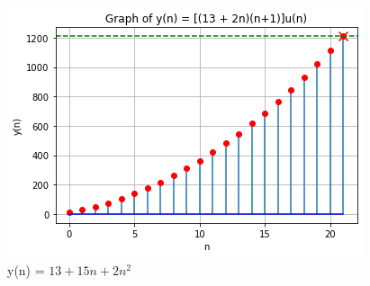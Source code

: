 \documentclass[journal,12pt,twocolumn]{IEEEtran}
\theoremstyle{remark}
\begin{document}
\begin{figure}[h]
  \centering
  \includegraphics[width=\columnwidth]{Graph/plot1.png}
  \caption{y(n) = $13 + 15n+2n^2$}
  \label{fig:graph}
\end{figure}
\end{document}
